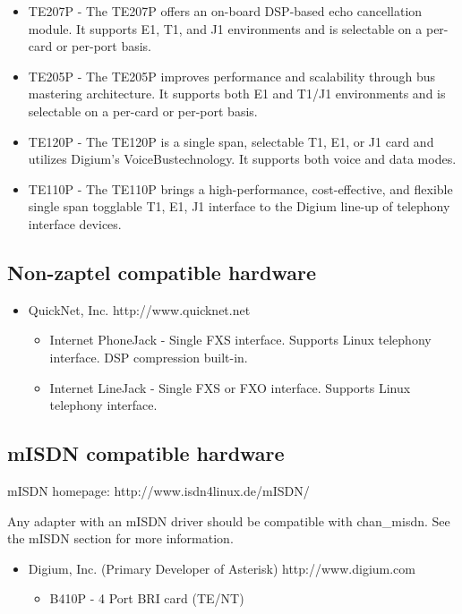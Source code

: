 \begin{itemize}
\begin{itemize}
\begin{itemize}
       \item TE207P - The TE207P offers an on-board DSP-based echo cancellation module. It supports E1, T1, and J1 environments and is selectable on a per-card or per-port basis.
       \item TE205P - The TE205P improves performance and scalability through bus mastering architecture. It supports both E1 and T1/J1 environments and is selectable on a per-card or per-port basis.
       \item TE120P - The TE120P is a single span, selectable T1, E1, or J1 card and utilizes Digium's VoiceBus\texttrademark technology. It supports both voice and data modes.       
       \item TE110P - The TE110P brings a high-performance, cost-effective, and flexible single span togglable T1, E1, J1 interface to the Digium line-up of telephony interface devices.
     \end{itemize}
  \end{itemize}
\end{itemize}

\subsection{Non-zaptel compatible hardware}

\begin{itemize}
  \item QuickNet, Inc. 
        http://www.quicknet.net
  \begin{itemize}
    \item Internet PhoneJack - Single FXS interface.  Supports Linux telephony
          interface.  DSP compression built-in.

    \item Internet LineJack - Single FXS or FXO interface.  Supports Linux 
          telephony interface.
  \end{itemize}
\end{itemize}

\subsection{mISDN compatible hardware}

mISDN homepage:  http://www.isdn4linux.de/mISDN/

Any adapter with an mISDN driver should be compatible with
chan\_misdn. See the mISDN section for more information.

\begin{itemize}
  \item Digium, Inc. (Primary Developer of Asterisk) 
  http://www.digium.com
  \begin{itemize}
    \item B410P - 4 Port BRI card (TE/NT)
   \end{itemize}
\end{itemize}

